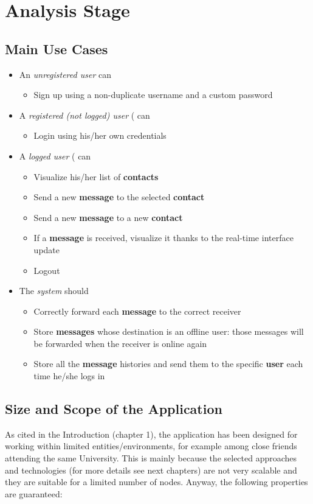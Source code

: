 \section{Analysis Stage}
\subsection{Main Use Cases}
\begin{itemize}
	\item An \textit{unregistered user} can
	\begin{itemize}
		\item Sign up using a non-duplicate username and a custom password
	\end{itemize}
	\item A \textit{registered (not logged) user} ( can
	\begin{itemize}
		\item Login using his/her own credentials
	\end{itemize}
	
	\item A \textit{logged user} ( can
	\begin{itemize}
		\item Visualize his/her list of \textbf{contacts}
		\item Send a new \textbf{message} to the selected \textbf{contact}
		\item Send a new \textbf{message}  to a new \textbf{contact}
		\item If a \textbf{message}  is received, visualize it thanks to the real-time interface update
		\item Logout
\end{itemize}
	\item The \textit{system} should
	\begin{itemize}
		\item Correctly forward each \textbf{message} to the correct receiver
		\item Store \textbf{messages} whose destination is an offline user: those messages will be forwarded when the receiver is online again
		\item Store all the \textbf{message} histories and send them to the specific \textbf{user} each time he/she logs in
	\end{itemize}
\end{itemize}

\subsection{Size and Scope of the Application}
As cited in the Introduction (chapter 1), the application has been designed for working within limited entities/environments, for example among close friends attending the same University. 
This is mainly because the selected approaches and technologies (for more details see next chapters) are not very scalable and they are suitable for a limited number of nodes.
Anyway, the following properties are guaranteed:


